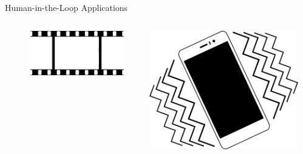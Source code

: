 \documentclass[aspectratio=1610]{beamer}
\begin{document}
\begin{frame}{Human-in-the-Loop Applications}
\begin{columns}[onlytextwidth]
\begin{column}{.1\linewidth}
        \end{column}%
        \begin{column}{.01\linewidth}
        \end{column}%
        \begin{column}{.1\linewidth}
            \centering%
            \includegraphics[width=\linewidth]{img/film.png}
        \end{column}%
        \begin{column}{.01\linewidth}
        \end{column}%
        \begin{column}{.1\linewidth}
            \centering%
            \includegraphics[width=\linewidth]{img/vibration.png}
        \end{column}%
        \begin{column}{.335\linewidth}%
        \end{column}%
    \end{columns}
\end{frame}
\end{document}
